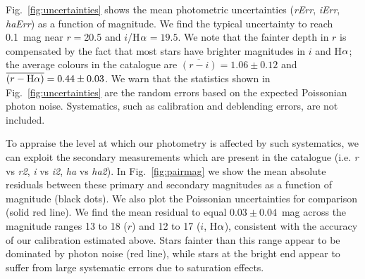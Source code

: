 \documentclass[useAMS,usenatbib]{mn2e}
\def\ha{\mbox{H$\rm \alpha$}}
\begin{document}
Fig.~\ref{fig:uncertainties} shows the mean photometric
uncertainties (\emph{rErr}, \emph{iErr}, \emph{haErr})
as a function of magnitude.
We find the typical uncertainty to reach 0.1~mag near $r=$20.5 
and $i$/\ha$=19.5$.
We note that the fainter depth in $r$ is compensated
by the fact that most stars have brighter magnitudes in $i$ and \ha;
the average colours in the catalogue are
$\overline{(r-i)}=1.06\pm0.12$ and $\overline{(r-\ha)}=0.44\pm0.03$.
We warn that the statistics shown in Fig.~\ref{fig:uncertainties}
are the random errors based on the expected Poissonian photon noise.
Systematics, such as calibration and deblending errors,
are not included.

To appraise the level at which our photometry is affected by such systematics,
we can exploit the secondary measurements which are present in the catalogue
(i.e. \emph{r} vs \emph{r2}, \emph{i} vs \emph{i2}, \emph{ha} vs \emph{ha2}).
In Fig.~\ref{fig:pairmag} we show the mean absolute residuals between
these primary and secondary magnitudes as a function of magnitude (black dots).
We also plot the Poissonian uncertainties for comparison (solid red line).
We find the mean residual to equal $0.03\pm0.04$~mag
across the magnitude ranges 13 to 18 ($r$)
and 12 to 17 ($i$, \ha),
consistent with the accuracy of our calibration estimated above.
Stars fainter than this range appear to be dominated by photon noise (red line),
while stars at the bright end appear to suffer from large systematic
errors due to saturation effects.
\end{document}
